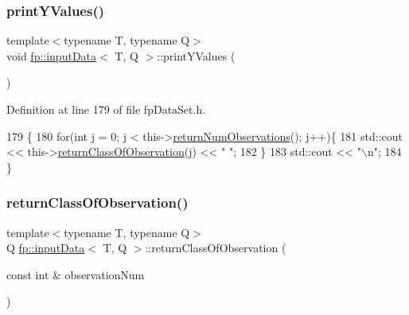 \subsubsection{\texorpdfstring{print\+Y\+Values()}{printYValues()}}
{\footnotesize\ttfamily template$<$typename T, typename Q$>$ \\
void \hyperlink{classfp_1_1inputData}{fp\+::input\+Data}$<$ T, Q $>$\+::print\+Y\+Values (\begin{DoxyParamCaption}{ }\end{DoxyParamCaption})\hspace{0.3cm}{\ttfamily [inline]}}



Definition at line 179 of file fp\+Data\+Set.\+h.


\begin{DoxyCode}
179                            \{
180             \textcolor{keywordflow}{for}(\textcolor{keywordtype}{int} j = 0; j < this->\hyperlink{classfp_1_1inputData_af7dc02941195e025d1d89c882096027d}{returnNumObservations}(); j++)\{
181                 std::cout << this->\hyperlink{classfp_1_1inputData_a0a767252e950159110d3f2a0c74064ec}{returnClassOfObservation}(j) << \textcolor{stringliteral}{" "};
182             \}
183             std::cout << \textcolor{stringliteral}{"\(\backslash\)n"};
184         \}
\end{DoxyCode}
\mbox{\label{classfp_1_1inputData_a0a767252e950159110d3f2a0c74064ec}} 
\subsubsection{\texorpdfstring{return\+Class\+Of\+Observation()}{returnClassOfObservation()}}
{\footnotesize\ttfamily template$<$typename T, typename Q$>$ \\
Q \hyperlink{classfp_1_1inputData}{fp\+::input\+Data}$<$ T, Q $>$\+::return\+Class\+Of\+Observation (\begin{DoxyParamCaption}\item[{const int \&}]{observation\+Num }\end{DoxyParamCaption})\hspace{0.3cm}{\ttfamily [inline]}}



